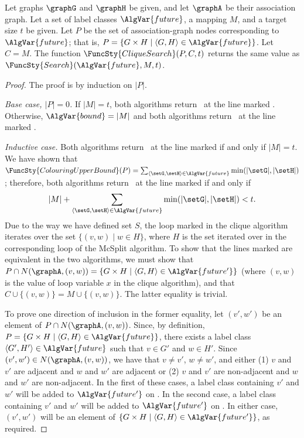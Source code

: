\begin{proposition}\label{cliqueMcSplitProp}
    Let graphs $\graphG$ and $\graphH$ be given, and let $\graphA$ be their association graph.
    Let a set of label classes $\AlgVar{future}$, a mapping $M$, and a target size $t$ be given.
    Let $P$ be the set of association-graph nodes corresponding to $\AlgVar{future}$; that is,
    $P = \{G \times H \mid \langle G,H \rangle \in \AlgVar{future}\}$.  Let $C = M$.
    The function $\FuncSty{CliqueSearch}(P,C,t)$ returns the same value as
    $\FuncSty{Search}(\AlgVar{future},M,t)$.
\end{proposition}
\begin{proof}
  The proof is by induction on $|P|$.

  \emph{Base case, $|P|=0$.} If $|M| = t$, both algorithms return \boolT\ at
    the line marked .  Otherwise, $\AlgVar{bound} = |M|$ and both
    algorithms return \boolF\ at the line marked .

  \emph{Inductive case.} Both algorithms return \boolT\ at the line marked
     if and only if $|M|=t$.  We have shown that $\FuncSty{ColouringUpperBound}(P) =
    \sum_{\langle \setG,\setH \rangle \in \AlgVar{future}} \min(|\setG|,|\setH|)$; therefore,
    both algorithms return \boolF\ at the line marked  if and only
    if 
\[
    |M| + \sum_{\langle \setG,\setH \rangle \in \AlgVar{future}} \min(|\setG|,|\setH|) < t.
\]
    Due to the way we have defined set $S$, the loop marked  in the clique
    algorithm iterates over the set $\{(v,w) \mid w \in H\}$, where $H$ is the set
    iterated over in the corresponding loop of the McSplit algorithm.  To show that the lines
    marked  are equivalent in the two algorithms, we must show that
    $P \cap N(\graphA, (v,w)) = \{G \times H \mid \langle G,H \rangle \in \AlgVar{future'}\}$
    (where $(v,w)$ is the value of loop variable $x$ in the clique algorithm), and that
    $C \cup \{(v,w)\} = M \cup \{(v,w)\}$.  The latter equality is trivial.

    To prove one direction of inclusion in the former equality, let $(v',w')$
    be an element of $P \cap N(\graphA, (v,w))$.  Since, by definition, $P =
    \{G \times H \mid \langle G,H \rangle \in \AlgVar{future}\}$, there exists
    a label class $\langle G',H' \rangle \in \AlgVar{future}$ such that $v \in
    G'$ and $w \in H'$.  Since $(v',w') \in N(\graphA, (v,w))$, we have that $v
    \not= v'$, $w \not= w'$, and either (1) $v$ and $v'$ are adjacent and $w$
    and $w'$ are adjacent or (2) $v$ and $v'$ are non-adjacent and $w$ and $w'$
    are non-adjacent.  In the first of these cases, a label class containing
    $v'$ and $w'$ will be added to $\AlgVar{future'}$ on
    .  In the second case, a label class
    containing $v'$ and $w'$ will be added to $\AlgVar{future'}$ on
    . In either case, $(v',w')$ will be an
    element of $\{G \times H \mid \langle G,H \rangle \in \AlgVar{future'}\}$,
    as required.


\end{proof}
